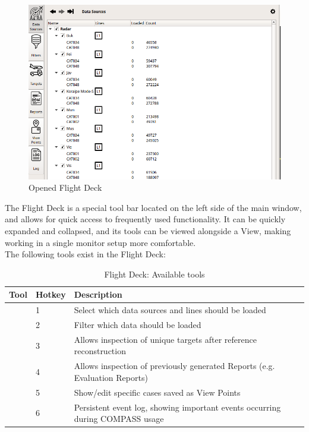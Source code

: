 \begin{figure}[H]
  \hspace*{-2.5cm}
  \center
  \includegraphics[width=12cm]{figures/ui_flight_deck.png}
  \caption{Opened Flight Deck}
\end{figure}

The Flight Deck is a special tool bar located on the left side of the main window, and allows for quick access to 
frequently used functionality. It can be quickly expanded and collapsed, and its tools can be viewed alongside a View,
making working in a single monitor setup more comfortable. \\

The following tools exist in the Flight Deck:

\begin{table}[H]
  \center
  \begin{tabular}{ | l | l | l | }
    \hline
    \textbf{Tool} & \textbf{Hotkey} & \textbf{Description} \\ \hline
    \nameref{sec:data_sources} & 1 & Select which data sources and lines should be loaded \\ \hline
    \nameref{sec:filters} & 2 & Filter which data should be loaded \\ \hline
    \nameref{sec:targets} & 3 & Allows inspection of unique targets after reference reconstruction \\ \hline
    \nameref{sec:reports} & 4 & Allows inspection of previously generated Reports (e.g. Evaluation Reports) \\ \hline
    \nameref{sec:view_points} & 5 & Show/edit specific cases saved as View Points \\ \hline
    \nameref{sec:task_log} & 6 & Persistent event log, showing important events occurring during COMPASS usage \\ \hline
  \end{tabular}
  \caption{Flight Deck: Available tools}
  \label{table:ui_flight_deck_tools}
\end{table}

